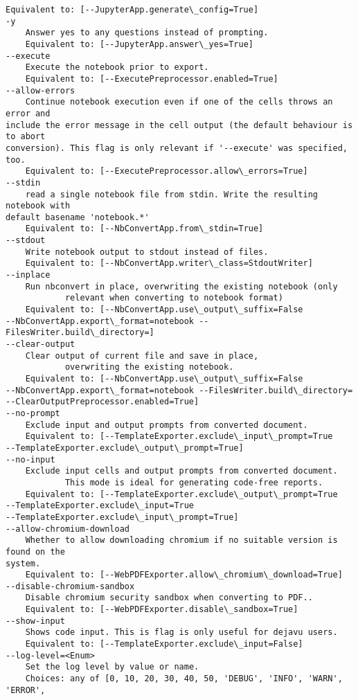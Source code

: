 \documentclass[11pt]{article}
\begin{document}
    \begin{Verbatim}[commandchars=\\\{\}]
    Equivalent to: [--JupyterApp.generate\_config=True]
-y
    Answer yes to any questions instead of prompting.
    Equivalent to: [--JupyterApp.answer\_yes=True]
--execute
    Execute the notebook prior to export.
    Equivalent to: [--ExecutePreprocessor.enabled=True]
--allow-errors
    Continue notebook execution even if one of the cells throws an error and
include the error message in the cell output (the default behaviour is to abort
conversion). This flag is only relevant if '--execute' was specified, too.
    Equivalent to: [--ExecutePreprocessor.allow\_errors=True]
--stdin
    read a single notebook file from stdin. Write the resulting notebook with
default basename 'notebook.*'
    Equivalent to: [--NbConvertApp.from\_stdin=True]
--stdout
    Write notebook output to stdout instead of files.
    Equivalent to: [--NbConvertApp.writer\_class=StdoutWriter]
--inplace
    Run nbconvert in place, overwriting the existing notebook (only
            relevant when converting to notebook format)
    Equivalent to: [--NbConvertApp.use\_output\_suffix=False
--NbConvertApp.export\_format=notebook --FilesWriter.build\_directory=]
--clear-output
    Clear output of current file and save in place,
            overwriting the existing notebook.
    Equivalent to: [--NbConvertApp.use\_output\_suffix=False
--NbConvertApp.export\_format=notebook --FilesWriter.build\_directory=
--ClearOutputPreprocessor.enabled=True]
--no-prompt
    Exclude input and output prompts from converted document.
    Equivalent to: [--TemplateExporter.exclude\_input\_prompt=True
--TemplateExporter.exclude\_output\_prompt=True]
--no-input
    Exclude input cells and output prompts from converted document.
            This mode is ideal for generating code-free reports.
    Equivalent to: [--TemplateExporter.exclude\_output\_prompt=True
--TemplateExporter.exclude\_input=True
--TemplateExporter.exclude\_input\_prompt=True]
--allow-chromium-download
    Whether to allow downloading chromium if no suitable version is found on the
system.
    Equivalent to: [--WebPDFExporter.allow\_chromium\_download=True]
--disable-chromium-sandbox
    Disable chromium security sandbox when converting to PDF..
    Equivalent to: [--WebPDFExporter.disable\_sandbox=True]
--show-input
    Shows code input. This is flag is only useful for dejavu users.
    Equivalent to: [--TemplateExporter.exclude\_input=False]
--log-level=<Enum>
    Set the log level by value or name.
    Choices: any of [0, 10, 20, 30, 40, 50, 'DEBUG', 'INFO', 'WARN', 'ERROR',

\end{Verbatim}
\end{document}
